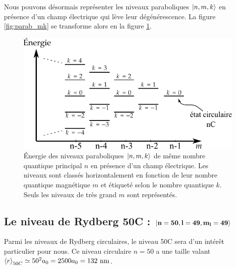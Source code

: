 Nous pouvons désormais représenter les niveaux paraboliques $\ket{n,m,k}$ en présence d'un champ électrique qui lève leur dégénérescence.
La figure \ref{fig:parab_mk} se transforme alors en la figure \ref{fig:Stark_nmk}.
%
\begin{figure}[!h]
\centering
\includegraphics[width=.8\linewidth]{figures/theory/Stark_nmk}
\caption[Échelle des niveaux paraboliques $\ket{n,m,k}$]{
Énergie des niveaux paraboliques $\ket{n,m,k}$ de même nombre quantique principal $n$ en présence d'un champ électrique.
Les niveaux sont classés horizontalement en fonction de leur nombre quantique magnétique $m$ et étiqueté selon le nombre quantique $k$.
Seuls les niveaux de très grand $m$ sont représentés.
}
\label{fig:Stark_nmk}
\end{figure}
%

\subsection{Le niveau de Rydberg 50C : $\mathbf{\ket{n=50,l=49,m_l=49}}$}\label{subsec:level_50C}

\noindent Parmi les niveaux de Rydberg circulaires, le niveau 50C sera d'un intérêt particulier pour nous.
Ce niveau circulaire $n=50$ a une taille valant $\braket{r}_{50C} \simeq 50^2 a_0 = 2500 a_0 = \numv{132}\si{\nano\meter}$.
	

